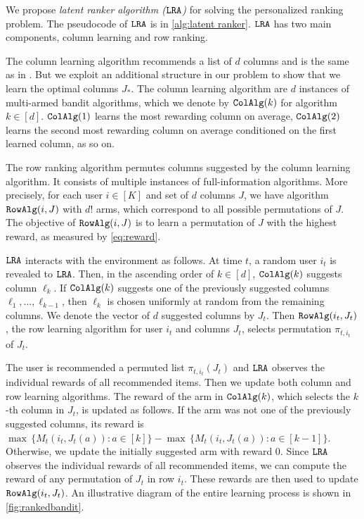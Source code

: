 
\newcommand{\colalg}{{\tt ColAlg}}
\newcommand{\expthree}{{\tt Exp3}}
\newcommand{\latentranker}{{\tt LRA}}
\newcommand{\rowalg}{{\tt RowAlg}}
\newcommand{\ucb}{{\tt UCB1}}

We propose \emph{latent ranker algorithm ($\latentranker$)} for solving the personalized ranking problem. The pseudocode of $\latentranker$ is in \cref{alg:latent ranker}. $\latentranker$ has two main components, column learning and row ranking.

The column learning algorithm recommends a list of $d$ columns and is the same as in \citet{radlinski2008learning}. But we exploit an additional structure in our problem to show that we learn the optimal columns $J_\ast$. The column learning algorithm are $d$ instances of multi-armed bandit algorithms, which we denote by $\colalg(k)$ for algorithm $k \in [d]$. $\colalg(1)$ learns the most rewarding column on average, $\colalg(2)$ learns the second most rewarding column on average conditioned on the first learned column, as so on.

The row ranking algorithm permutes columns suggested by the column learning algorithm. It consists of multiple instances of full-information algorithms. More precisely, for each user $i \in [K]$ and set of $d$ columns $J$, we have algorithm $\rowalg(i, J)$ with $d!$ arms, which correspond to all possible permutations of $J$. The objective of $\rowalg(i, J)$ is to learn a permutation of $J$ with the highest reward, as measured by \eqref{eq:reward}.

$\latentranker$ interacts with the environment as follows. At time $t$, a random user $i_t$ is revealed to $\latentranker$. Then, in the ascending order of $k \in [d]$, $\colalg(k)$ suggests column $\ell_k$. If $\colalg(k)$ suggests one of the previously suggested columns $\ell_1, \dots, \ell_{k - 1}$, then $\ell_k$ is chosen uniformly at random from the remaining columns. We denote the vector of $d$ suggested columns  by $J_t$. Then $\rowalg(i_t, J_t)$, the row learning algorithm for user $i_t$ and columns $J_t$, selects permutation $\pi_{t, i_t}$ of $J_t$.

The user is recommended a permuted list $\pi_{t, i_t}(J_t)$ and $\latentranker$ observes the individual rewards of all recommended items. Then we update both column and row learning algorithms. The reward of the arm in $\colalg(k)$, which selects the $k$-th column in $J_t$, is updated as follows. If the arm was not one of the previously suggested columns, its reward is $\max \, \{M_t(i_t, J_t(a)): a \in [k]\} - \max \, \{M_t(i_t, J_t(a)): a \in [k - 1]\}$. Otherwise, we update the initially suggested arm with reward $0$. Since $\latentranker$ observes the individual rewards of all recommended items, we can compute the reward of any permutation of $J_t$ in row $i_t$. These rewards are then used to update $\rowalg(i_t, J_t)$. An illustrative diagram of the entire learning process is shown in \cref{fig:rankedbandit}.

